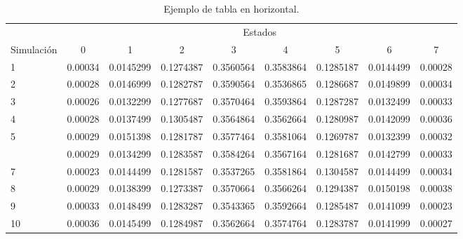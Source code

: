 \documentclass[a4paper,article,oneside,11pt]{memoir}
\begin{document}
\begin{table}
    \begin{center}
        \centering
        \begin{tabular}{@{}lcccccccc@{}}
            \toprule
            & \multicolumn{8}{c}{Estados} \\
            \cmidrule(lr){2-9}
            Simulación & 0 & 1 & 2 & 3 & 4 & 5 & 6 & 7\\
            \midrule
            1 & 0.00034 & 0.0145299 & 0.1274387 & 0.3560564 & 0.3583864 & 0.1285187 & 0.0144499 & 0.00028\\
            2 & 0.00028 & 0.0146999 & 0.1282787 & 0.3590564 & 0.3536865 & 0.1286687 & 0.0149899 & 0.00034\\
            3 & 0.00026 & 0.0132299 & 0.1277687 & 0.3570464 & 0.3593864 & 0.1287287 & 0.0132499 & 0.00033\\
            4 & 0.00028 & 0.0137499 & 0.1305487 & 0.3564864 & 0.3562664 & 0.1280987 & 0.0142099 & 0.00036\\
            5 & 0.00029 & 0.0151398 & 0.1281787 & 0.3577464 & 0.3581064 & 0.1269787 & 0.0132399 & 0.00032\\
            \addlinespace
            6 & 0.00029 & 0.0134299 & 0.1283587 & 0.3584264 & 0.3567164 & 0.1281687 & 0.0142799 & 0.00033\\
            7 & 0.00023 & 0.0144499 & 0.1281587 & 0.3537265 & 0.3581864 & 0.1304587 & 0.0144499 & 0.00034\\
            8 & 0.00029 & 0.0138399 & 0.1273387 & 0.3570664 & 0.3566264 & 0.1294387 & 0.0150198 & 0.00038\\
            9 & 0.00033 & 0.0148499 & 0.1283287 & 0.3543365 & 0.3592664 & 0.1285487 & 0.0141099 & 0.00023\\
            10 & 0.00036 & 0.0145499 & 0.1284987 & 0.3562664 & 0.3574764 & 0.1283787 & 0.0141999 & 0.00027\\
            \bottomrule
        \end{tabular}

        \caption{Ejemplo de tabla en horizontal.}
        \label{tab:tablita ancha}
    \end{center}
\end{table}
\end{document}

